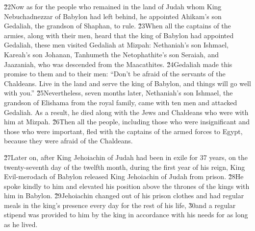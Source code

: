 \v{22}Now as for the people who remained in the land of Judah whom King Nebuchadnezzar of Babylon had left behind, he appointed Ahikam's son Gedaliah, the grandson of Shaphan, to rule. \v{23}When all the captains of the armies, along with their men, heard that the king of Babylon had appointed Gedaliah, these men visited Gedaliah at Mizpah: Nethaniah's son Ishmael, Kareah's son Johanan, Tanhumeth the Netophathite's son Seraiah, and Jaazaniah, who was descended from the Maacathites. \v{24}Gedaliah made this promise to them and to their men: ``Don't be afraid of the servants of the Chaldeans. Live in the land and serve the king of Babylon, and things will go well with you.'' \v{25}Nevertheless, seven months later, Nethaniah's son Ishmael, the grandson of Elishama from the royal family, came with ten men and attacked Gedaliah. As a result, he died along with the Jews and Chaldeans who were with him at Mizpah. \v{26}Then all the people, including those who were insignificant and those who were important, fled with the captains of the armed forces to Egypt, because they were afraid of the Chaldeans.

\v{27}Later on, after King Jehoiachin of Judah had been in exile for 37 years, on the twenty-seventh day of the twelfth month, during the first year of his reign, King Evil-merodach of Babylon released King Jehoiachin of Judah from prison. \v{28}He spoke kindly to him and elevated his position above the thrones of the kings with him in Babylon. \v{29}Jehoiachin changed out of his prison clothes and had regular meals in the king's presence every day for the rest of his life, \v{30}and a regular stipend was provided to him by the king in accordance with his needs for as long as he lived.
